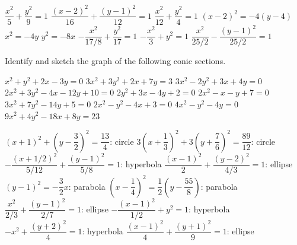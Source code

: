 \begin{Answer}\phantom{}
    \begin{multicols}{2}
    
    	\Question $\dfrac{x^2}{5} + \dfrac{y^2}{9} = 1$
    	\Question $\dfrac{(x-2)^2}{16} + \dfrac{(y-1)^2}{12} = 1$
    	\Question $\dfrac{x^2}{12} + \dfrac{y^2}{4} = 1$
    	\Question $(x-2)^2 = -4(y-4)$
    	\Question $x^2 = -4y$
    	\Question $y^2 = -8x$
    	\Question $-\dfrac{x^2}{17/8} + \dfrac{y^2}{17} = 1$
    	\Question $ -\dfrac{x^2}{3} + y^2 = 1$
    	\Question $\dfrac{x^2}{25/2} - \dfrac{(y-1)^2}{25/2} = 1$
    \EndCurrentQuestion
    \end{multicols}
\end{Answer}

\begin{Exercise} Identify and sketch the graph of the following conic sections.
    	\begin{multicols}{2}
    		\Question[difficulty = 1] $x^2+y^2+2x-3y=0$
    		\Question[difficulty = 2] $3x^2+3y^2+2x+7y=3$ 
    		\Question[difficulty = 2] $3x^2-2y^2+3x+4y=0$
    		\Question[difficulty = 1] $2x^2+3y^2-4x-12y+10=0$ 
    		\Question[difficulty = 1] $2y^2+3x-4y+2=0$  
    		\Question[difficulty = 1] $2x^2-x-y+7=0$  
    		\Question[difficulty = 1] $3x^2+7y^2-14y+5=0$ 
    		\Question[difficulty = 1] $2x^2-y^2-4x+3=0$ 
    		\Question[difficulty = 1] $4x^2-y^2-4y=0$
    		\Question[difficulty = 1] $9x^2+4y^2-18x+8y=23$
    		\EndCurrentQuestion
    	\end{multicols}

\end{Exercise}

\begin{Answer}\phantom{}
    \begin{multicols}{2}
    
    	\Question $(x+1)^2 + \left( y - \dfrac{3}{2} \right)^2 = \dfrac{13}{4} $: circle
    	\Question $3\left(x+ \dfrac{1}{3} \right)^2 + 3\left( y + \dfrac{7}{6} \right)^2 = \dfrac{89}{12}$: circle
    	\Question $-\dfrac{(x+1/2)^2}{5/12} + \dfrac{(y-1)^2}{5/8} = 1$: hyperbola
    	\Question $\dfrac{(x-1)^2}{2} + \dfrac{(y-2)^2}{4/3} = 1$: ellipse
    	\Question $(y-1)^2 = -\dfrac{3}{2}x$: parabola
    	\Question $\left(x- \dfrac{1}{4} \right)^2 = \dfrac{1}{2} \left( y - \dfrac{55}{8} \right)$: parabola
    	\Question $\dfrac{x^2}{2/3} + \dfrac{(y-1)^2}{2/7} = 1$: ellipse
    	\Question $- \dfrac{(x-1)^2}{1/2} + y^2 = 1$: hyperbola
    	\Question $- x^2 + \dfrac{(y+2)^2}{4} = 1$: hyperbola
    	\Question $\dfrac{(x-1)^2}{4} + \dfrac{(y+1)^2}{9} = 1$: ellipse
    \EndCurrentQuestion
    \end{multicols}
\end{Answer}

